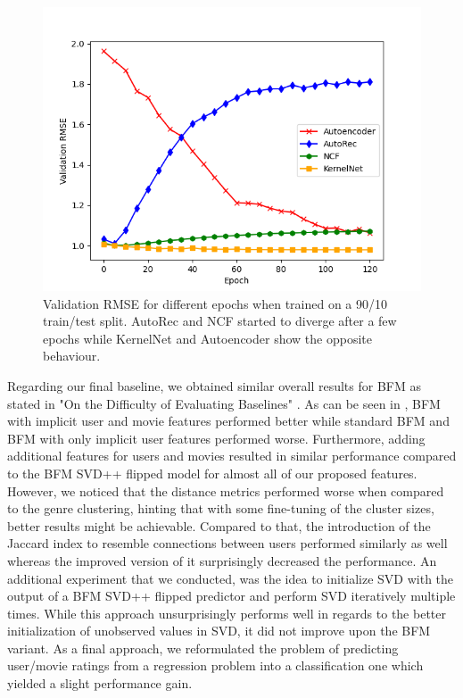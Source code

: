 \documentclass[10pt,conference,compsocconf]{IEEEtran}
\begin{document}
    \begin{figure}
        \includegraphics[width=\columnwidth]{figures/validation_plot.png}
        \caption{Validation RMSE for different epochs when trained on a 90/10 train/test split.
        AutoRec and NCF started to diverge after a few epochs while KernelNet and Autoencoder show the opposite behaviour.}
        \label{fig:validation}
    \end{figure}

    Regarding our final baseline, we obtained similar overall results for BFM as stated in "On the Difficulty of Evaluating Baselines" \cite{rendle_difficulty_2019}.
    As can be seen in , BFM with implicit user and movie features performed better while standard BFM and BFM with only implicit user features performed worse.
    Furthermore, adding additional features for users and movies resulted in similar performance compared to the BFM SVD++ flipped model for almost all of our proposed features.
    However, we noticed that the distance metrics performed worse when compared to the genre clustering, hinting that with some fine-tuning of the cluster sizes, better results might be achievable.
    Compared to that, the introduction of the Jaccard index to resemble connections between users performed similarly as well whereas the improved version of it surprisingly decreased the performance.
    An additional experiment that we conducted, was the idea to initialize SVD with the output of a BFM SVD++ flipped predictor and perform SVD iteratively multiple times.
    While this approach unsurprisingly performs well in regards to the better initialization of unobserved values in SVD, it did not improve upon the BFM variant.
    As a final approach, we reformulated the problem of predicting user/movie ratings from a regression problem into a classification one which yielded a slight performance gain.
\end{document}
